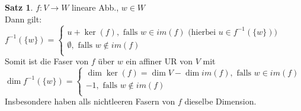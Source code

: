 \documentclass[10pt,a4paper,numbers=endperiod]{scrartcl}
\theoremstyle{definition}
\newtheorem{satz}{Satz}[section]
\begin{document}
\begin{satz}
	$f:V \rightarrow W$ lineare Abb., $w \in W$\\
	Dann gilt:\\
	$f^{-1} (\{w\}) = \begin{cases}
	u+ \ker(f), \text{ falls } w \in im(f) \text{ (hierbei $u \in f^{-1}(\{w\})$)}\\
	\emptyset, \text{ falls $w \notin im (f)$}\\
	\end{cases}$\\
	Somit ist die Faser von $f$ über $w$ ein affiner UR von $V$ mit\\
	$\dim f^{-1}(\{w\})= \begin{cases}
	\dim \ker(f) = \dim V - \dim im (f), \text{ falls $w \in im(f)$}\\
	-1, \text{ falls $w \notin im(f)$}\\
	\end{cases}$\\
	Insbesondere haben alls nichtleeren Fasern von $f$ dieselbe Dimension. 
\end{satz}
\newpage
\end{document}
